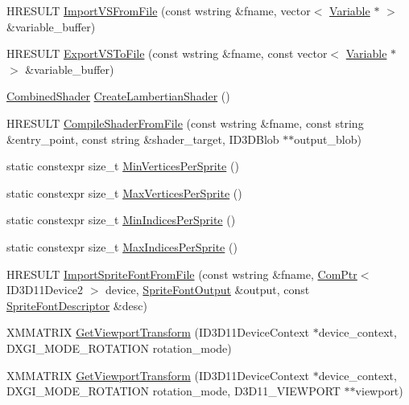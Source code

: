 \begin{DoxyCompactItemize}
H\+R\+E\+S\+U\+LT \hyperlink{namespacemage_ab13ac77392ebda63780e73f720237906}{Import\+V\+S\+From\+File} (const wstring \&fname, vector$<$ \hyperlink{structmage_1_1_variable}{Variable} $\ast$ $>$ \&variable\+\_\+buffer)
\item 
H\+R\+E\+S\+U\+LT \hyperlink{namespacemage_af5780face7eadab7a08f015e3516e137}{Export\+V\+S\+To\+File} (const wstring \&fname, const vector$<$ \hyperlink{structmage_1_1_variable}{Variable} $\ast$ $>$ \&variable\+\_\+buffer)
\item 
\hyperlink{structmage_1_1_combined_shader}{Combined\+Shader} \hyperlink{namespacemage_ab0bd21012fa29244f0f9b3201bebc2a5}{Create\+Lambertian\+Shader} ()
\item 
H\+R\+E\+S\+U\+LT \hyperlink{namespacemage_af63dbc237d243bcad8b6f2c0a9bb9163}{Compile\+Shader\+From\+File} (const wstring \&fname, const string \&entry\+\_\+point, const string \&shader\+\_\+target, I\+D3\+D\+Blob $\ast$$\ast$output\+\_\+blob)
\item 
static constexpr size\+\_\+t \hyperlink{namespacemage_afed1edb5e3a2ab2a2cd13ea06c72afc0}{Min\+Vertices\+Per\+Sprite} ()
\item 
static constexpr size\+\_\+t \hyperlink{namespacemage_ab7053197804193820c19712e1f35201f}{Max\+Vertices\+Per\+Sprite} ()
\item 
static constexpr size\+\_\+t \hyperlink{namespacemage_a7bf923eb07c1afb9e517fd5955aada32}{Min\+Indices\+Per\+Sprite} ()
\item 
static constexpr size\+\_\+t \hyperlink{namespacemage_aa0aa71a65f120f26014b08cff9ef992b}{Max\+Indices\+Per\+Sprite} ()
\item 
H\+R\+E\+S\+U\+LT \hyperlink{namespacemage_a3fa2cde82bebcbed04b2e5251e463f12}{Import\+Sprite\+Font\+From\+File} (const wstring \&fname, \hyperlink{namespacemage_ae74f374780900893caa5555d1031fd79}{Com\+Ptr}$<$ I\+D3\+D11\+Device2 $>$ device, \hyperlink{structmage_1_1_sprite_font_output}{Sprite\+Font\+Output} \&output, const \hyperlink{structmage_1_1_sprite_font_descriptor}{Sprite\+Font\+Descriptor} \&desc)
\item 
X\+M\+M\+A\+T\+R\+IX \hyperlink{namespacemage_a2d37559381f62998ab660694c0e45d68}{Get\+Viewport\+Transform} (I\+D3\+D11\+Device\+Context $\ast$device\+\_\+context, D\+X\+G\+I\+\_\+\+M\+O\+D\+E\+\_\+\+R\+O\+T\+A\+T\+I\+ON rotation\+\_\+mode)
\item 
X\+M\+M\+A\+T\+R\+IX \hyperlink{namespacemage_a07ec7b3cc09d526542d3c5ea7e17595a}{Get\+Viewport\+Transform} (I\+D3\+D11\+Device\+Context $\ast$device\+\_\+context, D\+X\+G\+I\+\_\+\+M\+O\+D\+E\+\_\+\+R\+O\+T\+A\+T\+I\+ON rotation\+\_\+mode, D3\+D11\+\_\+\+V\+I\+E\+W\+P\+O\+RT $\ast$$\ast$viewport)

\end{DoxyCompactItemize}
